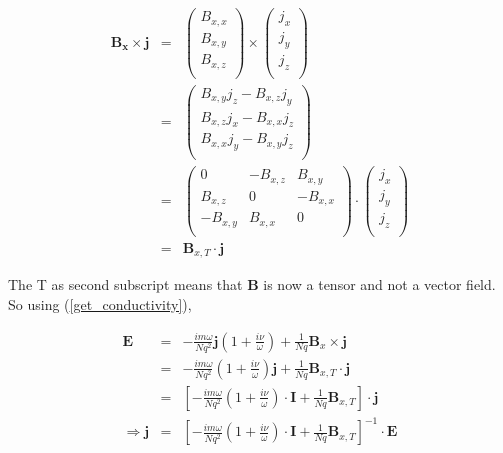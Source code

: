 \documentclass[a4paper,14pt]{extbook}
\begin{document}
\begin{eqnarray}
    \mathbf{B_x}\times \mathbf{j}&=&\left(%
\begin{array}{c}
  B_{x,x} \\
B_{x,y} \\
B_{x,z} \\\end{array}%
\right) \times \left(
\begin{array}{c}
  j_{x} \\
j_{y} \\
j_{z} \\\end{array}%
\right)\\
&=&\left(%
\begin{array}{c}
  B_{x,y} j_{z} -  B_{x,z} j_{y}\\
B_{x,z} j_{x} -  B_{x,x} j_{z} \\
B_{x,x} j_{y} -  B_{x,y} j_{z} \\\end{array}%
\right)\\
&=&\left(%
\begin{array}{ccc}
  0 & -B_{x,z} & B_{x,y} \\
B_{x,z} & 0 & -B_{x,x} \\
-B_{x,y} & B_{x,x} & 0 \\\end{array}%
\right)\cdot \left(
\begin{array}{c}
  j_{x} \\
j_{y} \\
j_{z} \\\end{array}%
\right)\\
&=&\mathbf{B}_{x,T} \cdot \mathbf{j}
\end{eqnarray}

The T as second subscript means that \textbf{B} is now a tensor and not a vector field. So using (\ref{get_conductivity}),

\begin{eqnarray}
    \mathbf{E}&=& -\frac{i m \omega }{Nq^2}\mathbf{j} \left( 1   +  \frac{i \nu}{ \omega}\right) +\frac{1}{Nq} \mathbf{B}_x \times \mathbf{j}\\
&=& -\frac{i m \omega }{Nq^2} \left( 1   +  \frac{i \nu}{ \omega}\right) \mathbf{j}+\frac{1}{Nq} \mathbf{B}_{x,T} \cdot \mathbf{j}\nonumber \\
&=& \left[ -\frac{i m \omega }{Nq^2} \left( 1   +  \frac{i \nu}{ \omega}\right) \cdot \mathbf{I}+\frac{1}{Nq} \mathbf{B}_{x,T} \right] \cdot \mathbf{j}\nonumber \\
\Rightarrow \mathbf{j} &=& \left[ -\frac{i m \omega }{Nq^2} \left( 1   +  \frac{i \nu}{ \omega}\right) \cdot \mathbf{I}+\frac{1}{Nq} \mathbf{B}_{x,T} \right]^{-1} \cdot \mathbf{E}
\end{eqnarray}
\end{document}
